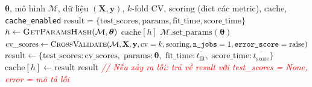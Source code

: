 \documentclass[12pt,a4paper]{article}
\begin{document}
\begin{algorithm}[H]
\caption{Đánh giá tổ hợp tham số đơn lẻ có bộ nhớ đệm (\textsc{EvaluateSingle})}
\label{alg:gs_eval_single}
\begin{algorithmic}[1]
\Require $\boldsymbol{\theta}$, mô hình $\mathcal{M}$, dữ liệu $(\mathbf{X}, \mathbf{y})$, $k$-fold CV, $\text{scoring}$ (dict các metric), $\text{cache}$, \texttt{cache\_enabled}
\Ensure $\text{result} = \{\text{test\_scores}, \text{params}, \text{fit\_time}, \text{score\_time}\}$
\State $h \gets \textsc{GetParamsHash}(\mathcal{M}, \boldsymbol{\theta})$
    \State \Return $\text{cache}[h]$ 
\EndIf
\State $\mathcal{M}.\text{set\_params}(\boldsymbol{\theta})$
\State $\text{cv\_scores} \gets \textsc{CrossValidate}(\mathcal{M}, \mathbf{X}, \mathbf{y}, \text{cv}=k, \text{scoring}, \texttt{n\_jobs}=1, \texttt{error\_score}=\text{raise})$
\Statex {}
\State $\text{result} \gets \{\text{test\_scores}: \text{cv\_scores},\; \text{params}: \boldsymbol{\theta},\; \text{fit\_time}: \overline{t_{\text{fit}}},\; \text{score\_time}: \overline{t_{\text{score}}}\}$
    \State $\text{cache}[h] \gets \text{result}$
\EndIf
\State \Return result
\Statex \textcolor{red}{\textit{// Nếu xảy ra lỗi: trả về result với test\_scores = None, error = mô tả lỗi}}
\end{algorithmic}
\end{algorithm}
\end{document}
